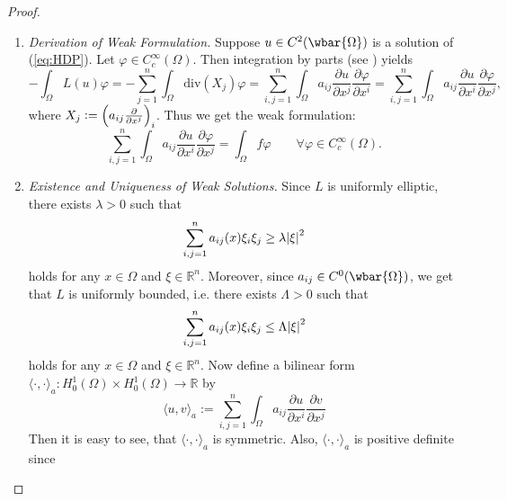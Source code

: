 \begin{proof}
	~
	\begin{enumerate}[label = \textit{Step \arabic*:},wide=0pt]
		\item \textit{Derivation of Weak Formulation.} Suppose $u \in C^2(\wbar{\Omega})$ is a solution of (\ref{eq:HDP}). Let $\varphi \in C^\infty_c(\Omega)$. Then integration by parts (see \cite[436]{lee:smooth_manifolds:2013}) yields
			\begin{equation*}
				-\int_\Omega L(u) \varphi = - \sum_{j = 1}^n \int_\Omega \mathrm{div}(X_j)\varphi = \sum_{i,j = 1}^n \int_\Omega a_{ij} \frac{\partial u}{\partial x^j}\frac{\partial \varphi}{\partial x^i} = \sum_{i,j = 1}^n \int_\Omega a_{ij} \frac{\partial u}{\partial x^i}\frac{\partial \varphi}{\partial x^j},
			\end{equation*}
			\noindent where $X_j := \del[2]{a_{ij}\frac{\partial}{\partial x^j}}_i$. Thus we get the weak formulation:
			\begin{equation}
				\label{eq:HDPweak}
				\sum_{i,j = 1}^n \int_\Omega a_{ij} \frac{\partial u}{\partial x^i}\frac{\partial \varphi}{\partial x^j} = \int_\Omega f \varphi \qquad \forall \varphi \in C^\infty_c(\Omega).
			\end{equation}
		\item \textit{Existence and Uniqueness of Weak Solutions.} Since $L$ is uniformly elliptic, there exists $\lambda > 0$ such that 
			\begin{equation*}
				\sum_{i,j = 1}^n a_{ij}(x) \xi_i \xi_j \geq \lambda \abs{\xi}^2
			\end{equation*}
			\noindent holds for any $x \in \Omega$ and $\xi \in \mathbb{R}^n$. Moreover, since $a_{ij} \in C^0(\wbar{\Omega})$, we get that $L$ is uniformly bounded, i.e. there exists $\Lambda > 0$ such that
			\begin{equation*}
				\sum_{i,j = 1}^n a_{ij}(x) \xi_i \xi_j \leq \Lambda \abs{\xi}^2
			\end{equation*}
			\noindent holds for any $x \in \Omega$ and $\xi \in \mathbb{R}^n$. Now define a bilinear form $\langle \cdot,\cdot \rangle_a : H^1_0(\Omega) \times H^1_0(\Omega) \to \mathbb{R}$ by
			\begin{equation}
				\label{eq:inner_prod}
				\langle u,v \rangle_a := \sum_{i,j = 1}^n \int_\Omega a_{ij} \frac{\partial u}{\partial x^i}\frac{\partial v}{\partial x^j}
			\end{equation}
			Then it is easy to see, that $\langle \cdot,\cdot\rangle_a$ is symmetric. Also, $\langle \cdot,\cdot \rangle_a$ is positive definite since

\end{enumerate}
\end{proof}
